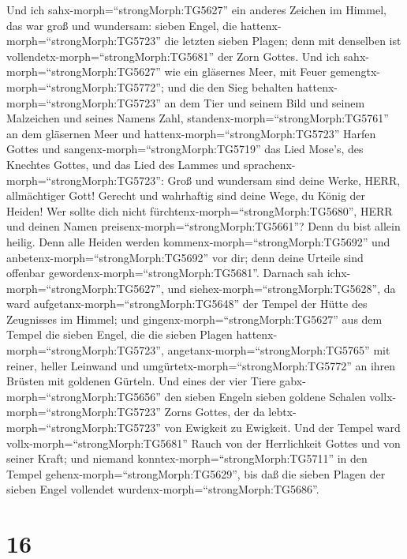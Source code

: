  Und ich sahx-morph=``strongMorph:TG5627'' ein anderes
Zeichen im Himmel, das war groß und wundersam: sieben Engel, die
hattenx-morph=``strongMorph:TG5723'' die letzten sieben Plagen; denn mit
denselben ist vollendetx-morph=``strongMorph:TG5681'' der Zorn Gottes.
 Und ich sahx-morph=``strongMorph:TG5627'' wie ein gläsernes
Meer, mit Feuer gemengtx-morph=``strongMorph:TG5772''; und die den Sieg
behalten hattenx-morph=``strongMorph:TG5723'' an dem Tier und seinem
Bild und seinem Malzeichen und seines Namens Zahl,
standenx-morph=``strongMorph:TG5761'' an dem gläsernen Meer und
hattenx-morph=``strongMorph:TG5723'' Harfen Gottes  und
sangenx-morph=``strongMorph:TG5719'' das Lied Mose's, des Knechtes
Gottes, und das Lied des Lammes und
sprachenx-morph=``strongMorph:TG5723'': Groß und wundersam sind deine
Werke, HERR, allmächtiger Gott! Gerecht und wahrhaftig sind deine Wege,
du König der Heiden!  Wer sollte dich nicht
fürchtenx-morph=``strongMorph:TG5680'', HERR und deinen Namen
preisenx-morph=``strongMorph:TG5661''? Denn du bist allein heilig. Denn
alle Heiden werden kommenx-morph=``strongMorph:TG5692'' und
anbetenx-morph=``strongMorph:TG5692'' vor dir; denn deine Urteile sind
offenbar gewordenx-morph=``strongMorph:TG5681''.  Darnach
sah ichx-morph=``strongMorph:TG5627'', und
siehex-morph=``strongMorph:TG5628'', da ward
aufgetanx-morph=``strongMorph:TG5648'' der Tempel der Hütte des
Zeugnisses im Himmel;  und
gingenx-morph=``strongMorph:TG5627'' aus dem Tempel die sieben Engel,
die die sieben Plagen hattenx-morph=``strongMorph:TG5723'',
angetanx-morph=``strongMorph:TG5765'' mit reiner, heller Leinwand und
umgürtetx-morph=``strongMorph:TG5772'' an ihren Brüsten mit goldenen
Gürteln.  Und eines der vier Tiere
gabx-morph=``strongMorph:TG5656'' den sieben Engeln sieben goldene
Schalen vollx-morph=``strongMorph:TG5723'' Zorns Gottes, der da
lebtx-morph=``strongMorph:TG5723'' von Ewigkeit zu Ewigkeit.
 Und der Tempel ward vollx-morph=``strongMorph:TG5681''
Rauch von der Herrlichkeit Gottes und von seiner Kraft; und niemand
konntex-morph=``strongMorph:TG5711'' in den Tempel
gehenx-morph=``strongMorph:TG5629'', bis daß die sieben Plagen der
sieben Engel vollendet wurdenx-morph=``strongMorph:TG5686''.

\hypertarget{section-15}{%
\section{16}\label{section-15}}

